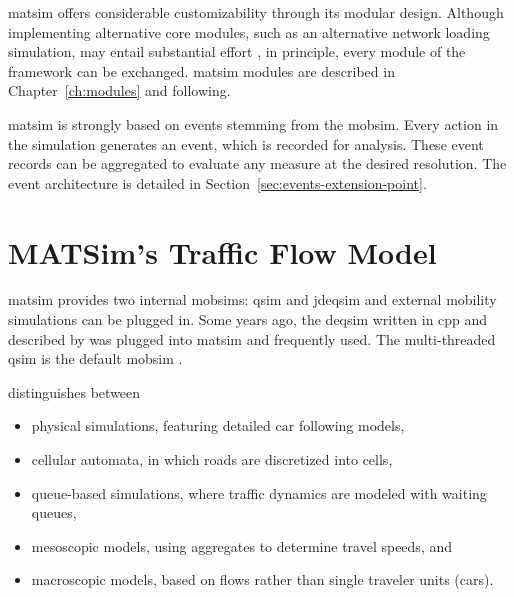 \gls{matsim} offers considerable customizability through its modular design. Although %
implementing alternative core modules, such as an alternative network loading simulation, may entail substantial effort \citep[][Section 2.4]{MATSim_Userguide_2015}, in principle, every module of the framework can be exchanged. \gls{matsim} modules are described in Chapter~\ref{ch:modules} and following.

\gls{matsim} is strongly based on events stemming from the \gls{mobsim}. Every action in the simulation generates an event, which is recorded for analysis. These event records can be aggregated to evaluate any measure at the desired resolution. The event architecture is detailed in Section~\ref{sec:events-extension-point}.

\section{MATSim's Traffic Flow Model}
\label{sec:trafficflowmodel}
\gls{matsim} provides two internal \glspl{mobsim}: \gls{qsim} and \gls{jdeqsim} and external mobility simulations can be plugged in. Some years ago, the \gls{deqsim} written in \gls{cpp} and described by \citet[][]{Charypar_PhDThesis_2008, CharyparEtAl_TRR_2007, CharyparEtAl_TRB_2009, CharyparEtAl_WCTRS_2007} was plugged into \gls{matsim} and frequently used. The multi-threaded \gls{qsim} is the default \gls{mobsim} \citep[][]{MATSim_Userguide_2015}. %

\citet[][]{CharyparEtAl_TRB_2009} distinguishes between 
\begin{itemize}\styleItemize
\item physical simulations, featuring detailed car following models, %
\item cellular automata, in which roads are discretized into cells,
\item queue-based simulations, where traffic dynamics are modeled with waiting queues,
\item mesoscopic models, using aggregates to determine travel speeds, and
\item macroscopic models, based on flows rather than single traveler units (\eg cars).
\end{itemize}

